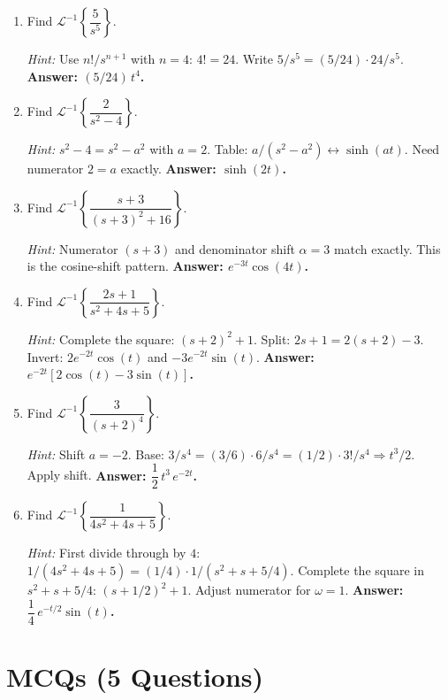 \documentclass[12pt,a4paper]{article}
\begin{document}
\begin{enumerate}[leftmargin=*, label=\textbf{P\arabic*.}]

\item Find $\mathcal{L}^{-1}\!\left\{\dfrac{5}{s^5}\right\}$.

\textit{Hint:} Use $n!/s^{n+1}$ with $n = 4$: $4! = 24$.
Write $5/s^5 = (5/24)\cdot 24/s^5$.
\textbf{Answer: $(5/24)\,t^4$.}

\item Find $\mathcal{L}^{-1}\!\left\{\dfrac{2}{s^2-4}\right\}$.

\textit{Hint:} $s^2 - 4 = s^2 - a^2$ with $a = 2$. Table: $a/(s^2-a^2) \leftrightarrow \sinh(at)$.
Need numerator $2 = a$ exactly.
\textbf{Answer: $\sinh(2t)$.}

\item Find $\mathcal{L}^{-1}\!\left\{\dfrac{s+3}{(s+3)^2+16}\right\}$.

\textit{Hint:} Numerator $(s+3)$ and denominator shift $\alpha = 3$ match exactly. This is the
cosine-shift pattern.
\textbf{Answer: $e^{-3t}\cos(4t)$.}

\item Find $\mathcal{L}^{-1}\!\left\{\dfrac{2s+1}{s^2+4s+5}\right\}$.

\textit{Hint:} Complete the square: $(s+2)^2 + 1$. Split: $2s+1 = 2(s+2) - 3$.
Invert: $2e^{-2t}\cos(t)$ and $-3e^{-2t}\sin(t)$.
\textbf{Answer: $e^{-2t}[2\cos(t) - 3\sin(t)]$.}

\item Find $\mathcal{L}^{-1}\!\left\{\dfrac{3}{(s+2)^4}\right\}$.

\textit{Hint:} Shift $a = -2$. Base: $3/s^4 = (3/6)\cdot 6/s^4 = (1/2)\cdot 3!/s^4 \Rightarrow t^3/2$.
Apply shift.
\textbf{Answer: $\dfrac{1}{2}\,t^3\,e^{-2t}$.}

\item Find $\mathcal{L}^{-1}\!\left\{\dfrac{1}{4s^2+4s+5}\right\}$.

\textit{Hint:} First divide through by $4$: $1/(4s^2+4s+5) = (1/4)\cdot 1/(s^2+s+5/4)$.
Complete the square in $s^2+s+5/4$: $(s+1/2)^2 + 1$. Adjust numerator for $\omega=1$.
\textbf{Answer: $\dfrac{1}{4}\,e^{-t/2}\sin(t)$.}

\end{enumerate}

\section{MCQs (5 Questions)}
\end{document}
